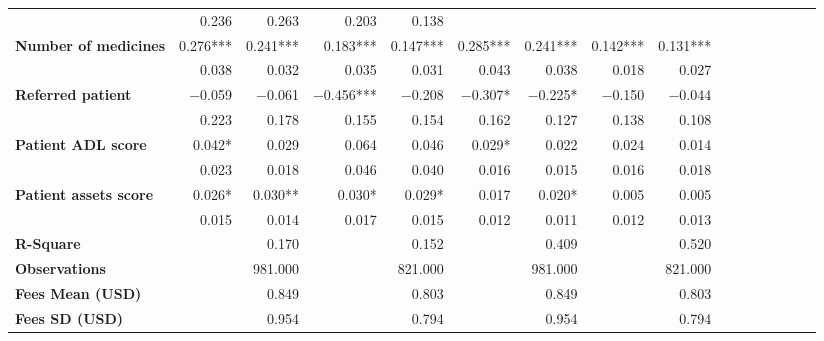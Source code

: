 \begin{tabular}{@{\extracolsep{5pt}}lrrrrrrrrrrrrrrr}
{\bf } & 0.236\phantom{***} & 0.263\phantom{***} & 0.203\phantom{***} & 0.138\phantom{***} & \phantom{***} & \phantom{***} & \phantom{***} & \phantom{***} \\
{\bf Number of medicines} & 0.276*** & 0.241*** & 0.183*** & 0.147*** & 0.285*** & 0.241*** & 0.142*** & 0.131*** \\
{\bf } & 0.038\phantom{***} & 0.032\phantom{***} & 0.035\phantom{***} & 0.031\phantom{***} & 0.043\phantom{***} & 0.038\phantom{***} & 0.018\phantom{***} & 0.027\phantom{***} \\
{\bf Referred patient} & $-$0.059\phantom{***} & $-$0.061\phantom{***} & $-$0.456*** & $-$0.208\phantom{***} & $-$0.307*\phantom{**} & $-$0.225*\phantom{**} & $-$0.150\phantom{***} & $-$0.044\phantom{***} \\
{\bf } & 0.223\phantom{***} & 0.178\phantom{***} & 0.155\phantom{***} & 0.154\phantom{***} & 0.162\phantom{***} & 0.127\phantom{***} & 0.138\phantom{***} & 0.108\phantom{***} \\
{\bf Patient ADL score} & 0.042*\phantom{**} & 0.029\phantom{***} & 0.064\phantom{***} & 0.046\phantom{***} & 0.029*\phantom{**} & 0.022\phantom{***} & 0.024\phantom{***} & 0.014\phantom{***} \\
{\bf } & 0.023\phantom{***} & 0.018\phantom{***} & 0.046\phantom{***} & 0.040\phantom{***} & 0.016\phantom{***} & 0.015\phantom{***} & 0.016\phantom{***} & 0.018\phantom{***} \\
{\bf Patient assets score} & 0.026*\phantom{**} & 0.030**\phantom{*} & 0.030*\phantom{**} & 0.029*\phantom{**} & 0.017\phantom{***} & 0.020*\phantom{**} & 0.005\phantom{***} & 0.005\phantom{***} \\
{\bf } & 0.015\phantom{***} & 0.014\phantom{***} & 0.017\phantom{***} & 0.015\phantom{***} & 0.012\phantom{***} & 0.011\phantom{***} & 0.012\phantom{***} & 0.013\phantom{***} \\
{\bf R-Square} & \phantom{***} & 0.170\phantom{***} & \phantom{***} & 0.152\phantom{***} & \phantom{***} & 0.409\phantom{***} & \phantom{***} & 0.520\phantom{***} \\
{\bf Observations} & \phantom{***} & 981.000\phantom{***} & \phantom{***} & 821.000\phantom{***} & \phantom{***} & 981.000\phantom{***} & \phantom{***} & 821.000\phantom{***} \\
{\bf Fees Mean (USD)} & \phantom{***} & 0.849\phantom{***} & \phantom{***} & 0.803\phantom{***} & \phantom{***} & 0.849\phantom{***} & \phantom{***} & 0.803\phantom{***} \\
{\bf Fees SD (USD)} & \phantom{***} & 0.954\phantom{***} & \phantom{***} & 0.794\phantom{***} & \phantom{***} & 0.954\phantom{***} & \phantom{***} & 0.794\phantom{***} \\
\hline
\end{tabular}
